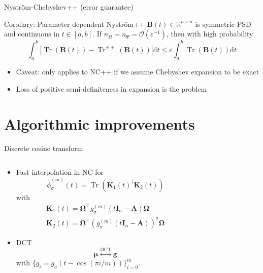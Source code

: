 \documentclass[aspectratio=169, leqno, 12pt]{beamer}
\newcommand{\mtx}[1]{\boldsymbol{#1}}
\newcommand{\vct}[1]{\boldsymbol{#1}}
\DeclareMathOperator{\Tr}{Tr}
\DeclareMathOperator{\DCT}{DCT}
\begin{document}
\begin{frame}{Nystr\"om-Chebyshev++ (error guarantee)}
    \begin{block}{Corollary: Parameter dependent Nystr\"om++}
        $\mtx{B}(t) \in \mathbb{R}^{n \times n}$ is symmetric \gls{PSD}
        and continuous in $t \in [a, b]$. If $n_{\Omega} = n_{\Psi} = \mathcal{O}\left( \varepsilon^{-1} \right)$,
        then with high probability
        \begin{equation}
            \int_{a}^{b} |\Tr(\mtx{B}(t)) - \Tr^{++}(\mtx{B}(t))| \mathrm{d}t \leq \varepsilon \int_{a}^{b}\Tr(\mtx{B}(t)) \mathrm{d}t
        \end{equation}
    \end{block}
    \begin{itemize}
        \item Caveat: only applies to NC++ if we assume Chebyshev expansion to be exact
        \item Loss of positive semi-definiteness in expansion is the problem
    \end{itemize}
\end{frame}

\section{Algorithmic improvements}

\begin{frame}{Discrete cosine transform}
    \begin{columns}
        \begin{column}{0.55\textwidth}
            \begin{itemize}
                \item Fast interpolation in \gls{NC} for
                \begin{equation}
                    \widehat{\phi}_{\sigma}^{(m)}(t) = \Tr(\mtx{K}_1(t)^{\dagger} \mtx{K}_2(t))
                \end{equation}
                with
                \begin{align}
                    \mtx{K}_1(t) = \mtx{\Omega}^{\top} g_{\sigma}^{(m)}(t\mtx{I}_n - \mtx{A}) \mtx{\Omega} \\
                    \mtx{K}_2(t) = \mtx{\Omega}^{\top} (g_{\sigma}^{(m)}(t\mtx{I}_n - \mtx{A}))^2 \mtx{\Omega}
                \end{align}
                \item \Gls{DCT}
                \begin{equation}
                    \vct{\mu} \stackrel{\DCT}{\longleftrightarrow} \vct{g}
                \end{equation}
                with $\{g_i = g_{\sigma}(t - \cos(\pi i / m))\}_{i=0}^m$.
            \end{itemize}
        \end{column}
        \begin{column}{0.45\textwidth}
            \scalebox{0.65}{}
        \end{column}
    \end{columns}
\end{frame}
\end{document}
